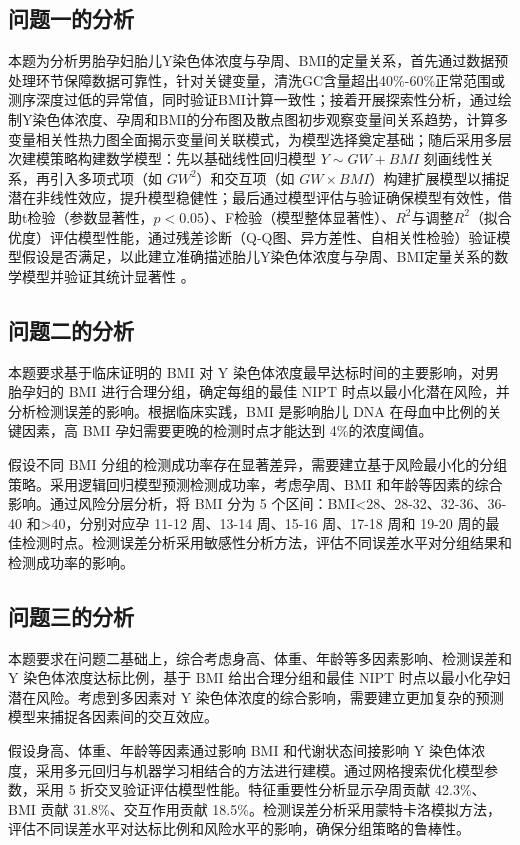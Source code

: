 \documentclass[withoutpreface,bwprint]{cumcmthesis} %
\begin{document}
\subsection{问题一的分析}

本题为分析男胎孕妇胎儿Y染色体浓度与孕周、BMI的定量关系，首先通过数据预处理环节保障数据可靠性，针对关键变量，清洗GC含量超出40\%-60\%正常范围或测序深度过低的异常值，同时验证BMI计算一致性；接着开展探索性分析，通过绘制Y染色体浓度、孕周和BMI的分布图及散点图初步观察变量间关系趋势，计算多变量相关性热力图全面揭示变量间关联模式，为模型选择奠定基础；随后采用多层次建模策略构建数学模型：先以基础线性回归模型 $Y \sim GW + BMI$ 刻画线性关系，再引入多项式项（如 $GW^2$）和交互项（如 $GW \times BMI$）构建扩展模型以捕捉潜在非线性效应，提升模型稳健性；最后通过模型评估与验证确保模型有效性，借助t检验（参数显著性，$p<0.05$）、F检验（模型整体显著性）、$R^2$与调整$R^2$（拟合优度）评估模型性能，通过残差诊断（Q-Q图、异方差性、自相关性检验）验证模型假设是否满足，以此建立准确描述胎儿Y染色体浓度与孕周、BMI定量关系的数学模型并验证其统计显著性 。

\subsection{问题二的分析}

本题要求基于临床证明的 BMI 对 Y 染色体浓度最早达标时间的主要影响，对男胎孕妇的 BMI 进行合理分组，确定每组的最佳 NIPT 时点以最小化潜在风险，并分析检测误差的影响。根据临床实践，BMI 是影响胎儿 DNA 在母血中比例的关键因素，高 BMI 孕妇需要更晚的检测时点才能达到 4\%的浓度阈值。

假设不同 BMI 分组的检测成功率存在显著差异，需要建立基于风险最小化的分组策略。采用逻辑回归模型预测检测成功率，考虑孕周、BMI 和年龄等因素的综合影响。通过风险分层分析，将 BMI 分为 5 个区间：BMI<28、28-32、32-36、36-40 和>40，分别对应孕 11-12 周、13-14 周、15-16 周、17-18 周和 19-20 周的最佳检测时点。检测误差分析采用敏感性分析方法，评估不同误差水平对分组结果和检测成功率的影响。

\subsection{问题三的分析}

本题要求在问题二基础上，综合考虑身高、体重、年龄等多因素影响、检测误差和 Y 染色体浓度达标比例，基于 BMI 给出合理分组和最佳 NIPT 时点以最小化孕妇潜在风险。考虑到多因素对 Y 染色体浓度的综合影响，需要建立更加复杂的预测模型来捕捉各因素间的交互效应。

假设身高、体重、年龄等因素通过影响 BMI 和代谢状态间接影响 Y 染色体浓度，采用多元回归与机器学习相结合的方法进行建模。通过网格搜索优化模型参数，采用 5 折交叉验证评估模型性能。特征重要性分析显示孕周贡献 42.3\%、BMI 贡献 31.8\%、交互作用贡献 18.5\%。检测误差分析采用蒙特卡洛模拟方法，评估不同误差水平对达标比例和风险水平的影响，确保分组策略的鲁棒性。
\end{document}
